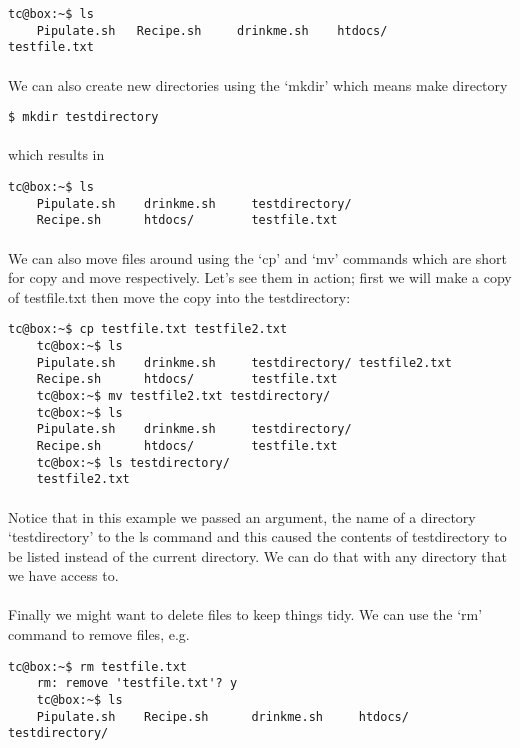 \documentclass[12pt, a4paper, twoside]{book}
\begin{document}
\begin{lstlisting}[style=DOS]
    tc@box:~$ ls
    Pipulate.sh   Recipe.sh     drinkme.sh    htdocs/       testfile.txt
\end{lstlisting}

\paragraph{} We can also create new directories using the `mkdir' which means make directory
\begin{lstlisting}[style=DOS]
    $ mkdir testdirectory
\end{lstlisting}

\paragraph{} which results in

\begin{lstlisting}[style=DOS]
    tc@box:~$ ls
    Pipulate.sh    drinkme.sh     testdirectory/
    Recipe.sh      htdocs/        testfile.txt
\end{lstlisting}
\paragraph{} We can also move files around using the `cp' and `mv' commands which are short for copy and move respectively. Let's see them in action; first we will make a copy of testfile.txt then move the copy into the testdirectory:
\begin{lstlisting}[style=DOS]
    tc@box:~$ cp testfile.txt testfile2.txt
    tc@box:~$ ls
    Pipulate.sh    drinkme.sh     testdirectory/ testfile2.txt
    Recipe.sh      htdocs/        testfile.txt
    tc@box:~$ mv testfile2.txt testdirectory/
    tc@box:~$ ls
    Pipulate.sh    drinkme.sh     testdirectory/
    Recipe.sh      htdocs/        testfile.txt
    tc@box:~$ ls testdirectory/
    testfile2.txt
\end{lstlisting}

\paragraph{} Notice that in this example we passed an argument, the name of a directory `testdirectory' to the ls command and this caused the contents of testdirectory to be listed instead of the current directory. We can do that with any directory that we have access to.

\paragraph{} Finally we might want to delete files to keep things tidy. We can use the `rm' command to remove files, e.g.
\begin{lstlisting}[style=DOS]
    tc@box:~$ rm testfile.txt 
    rm: remove 'testfile.txt'? y
    tc@box:~$ ls
    Pipulate.sh    Recipe.sh      drinkme.sh     htdocs/        testdirectory/
\end{lstlisting}
\end{document}
